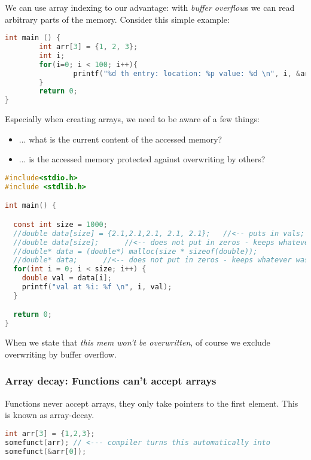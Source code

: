 We can use array indexing to our advantage: with \emph{buffer overflow}s we can read arbitrary parts of the memory. 
Consider this simple example:

\begin{lstlisting}[language=c]
   int main () {
        int arr[3] = {1, 2, 3};
        int i;
        for(i=0; i < 100; i++){
                printf("%d th entry: location: %p value: %d \n", i, &arr[i], arr[i]);
        }
        return 0;
} 
\end{lstlisting}

Especially when creating arrays, we need to be aware of a few things: 
\begin{itemize}
	\item ... what is the current content of the accessed memory?
	\item ... is the accessed memory protected against overwriting by others?
\end{itemize}

\begin{lstlisting}[language=c]
#include<stdio.h>
#include <stdlib.h>  

int main() {

  const int size = 1000;
  //double data[size] = {2.1,2.1,2.1, 2.1, 2.1};   //<-- puts in vals; fills rest with zeros. This mem won't be overwritten. 
  //double data[size];      //<-- does not put in zeros - keeps whatever was in there before. This mem won't be overwritten.
  //double* data = (double*) malloc(size * sizeof(double));              //<-- puts in zeros. This mem won't be overwritten.
  //double* data;      //<-- does not put in zeros - keeps whatever was in there before. This mem can be overwritten by others! 
  for(int i = 0; i < size; i++) {
    double val = data[i];
    printf("val at %i: %f \n", i, val);
  }

  return 0; 
}
\end{lstlisting}
When we state that \emph{this mem won't be overwritten}, of course we exclude overwriting by buffer overflow. 

\subsubsection{Array decay: Functions can't accept arrays}

Functions never accept arrays, they only take pointers to the first element. This is known as array-decay.

\begin{lstlisting}[language=c]
int arr[3] = {1,2,3};
somefunct(arr); // <--- compiler turns this automatically into 
somefunct(&arr[0]);
\end{lstlisting}



